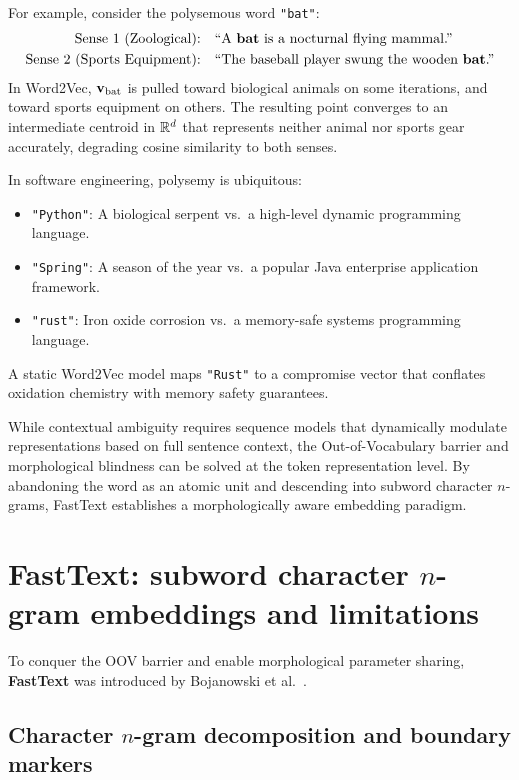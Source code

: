 \documentclass[../../main.tex]{subfiles}
\begin{document}
For example, consider the polysemous word \texttt{"bat"}:
\begin{align*}
\text{Sense 1 (Zoological):} \quad &\text{``A \textbf{bat} is a nocturnal flying mammal.''} \\
\text{Sense 2 (Sports Equipment):} \quad &\text{``The baseball player swung the wooden \textbf{bat}.''}
\end{align*}
In Word2Vec, $\mathbf{v}_{\text{bat}}$ is pulled toward biological animals on some iterations, and toward sports equipment on others. The resulting point converges to an intermediate centroid in $\mathbb{R}^d$ that represents neither animal nor sports gear accurately, degrading cosine similarity to both senses.

In software engineering, polysemy is ubiquitous:
\begin{itemize}
    \item \texttt{"Python"}: A biological serpent vs.~a high-level dynamic programming language.
    \item \texttt{"Spring"}: A season of the year vs.~a popular Java enterprise application framework.
    \item \texttt{"rust"}: Iron oxide corrosion vs.~a memory-safe systems programming language.
\end{itemize}
A static Word2Vec model maps \texttt{"Rust"} to a compromise vector that conflates oxidation chemistry with memory safety guarantees.

While contextual ambiguity requires sequence models that dynamically modulate representations based on full sentence context, the Out-of-Vocabulary barrier and morphological blindness can be solved at the token representation level. By abandoning the word as an atomic unit and descending into subword character $n$-grams, FastText establishes a morphologically aware embedding paradigm.

\clearpage


\clearpage
\section{FastText: subword character $n$-gram embeddings and limitations}
\label{sec:fasttext_subwords}

To conquer the OOV barrier and enable morphological parameter sharing, \textbf{FastText} was introduced by Bojanowski et al.~\cite{bojanowski2017}.

\subsection{Character \texorpdfstring{$n$}{n}-gram decomposition and boundary markers}
\label{subsec:character_ngrams}
\end{document}
